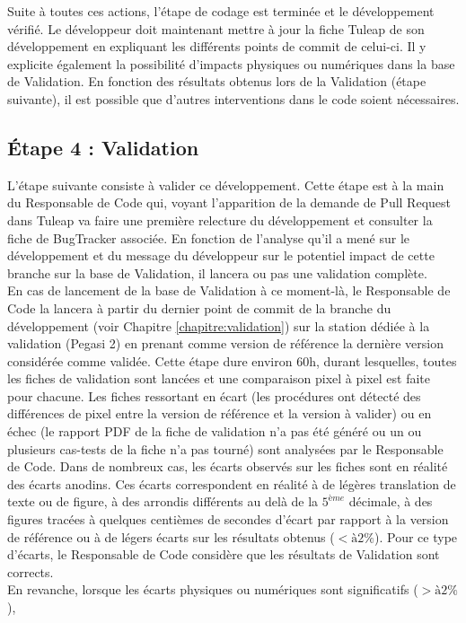 Suite à toutes ces actions, l'étape de codage est terminée et le développement vérifié.
Le développeur doit maintenant mettre à jour la fiche Tuleap de son développement
en expliquant les différents points de commit de celui-ci.
Il y explicite également la possibilité d'impacts physiques ou numériques dans la base de Validation.
En fonction des résultats obtenus lors de la Validation (étape suivante), il est possible que d'autres interventions dans le code soient nécessaires.

\subsection{Étape 4 : Validation}
L'étape suivante consiste à valider ce développement.
Cette étape est à la main du Responsable de Code qui, voyant l'apparition de la demande de Pull Request dans Tuleap
va faire une première relecture du développement et consulter la fiche de BugTracker associée.
En fonction de l'analyse qu'il a mené sur le développement et du message du développeur sur le potentiel impact
de cette branche sur la base de Validation, il lancera ou pas une validation complète.\\
En cas de lancement de la base de Validation à ce moment-là,
le Responsable de Code la lancera à partir du dernier point de commit
de la branche du développement (voir Chapitre \ref{chapitre:validation})
sur la station dédiée à la validation (Pegasi 2) en prenant comme version de référence
la dernière version considérée comme validée.
Cette étape dure environ 60h, durant lesquelles, toutes les fiches de validation sont lancées
et une comparaison pixel à pixel est faite pour chacune.
Les fiches ressortant en écart (les procédures ont détecté des différences de pixel
entre la version de référence et la version à valider) ou en échec
(le rapport PDF de la fiche de validation n'a pas été généré ou un ou plusieurs
cas-tests de la fiche n'a pas tourné) sont analysées par le Responsable de Code.
Dans de nombreux cas, les écarts observés sur les fiches sont en réalité des écarts anodins.
Ces écarts correspondent en réalité à de légères translation de texte ou de figure,
à des arrondis différents au delà de la $5^{ème}$ décimale, à des figures
tracées à quelques centièmes de secondes d'écart par rapport à la version
de référence ou à de légers écarts sur les résultats obtenus ($< à  2 \%$).
Pour ce type d'écarts, le Responsable de Code considère que les résultats de Validation sont corrects.\\
En revanche, lorsque les écarts physiques ou numériques sont significatifs ($> à 2  \%$),

